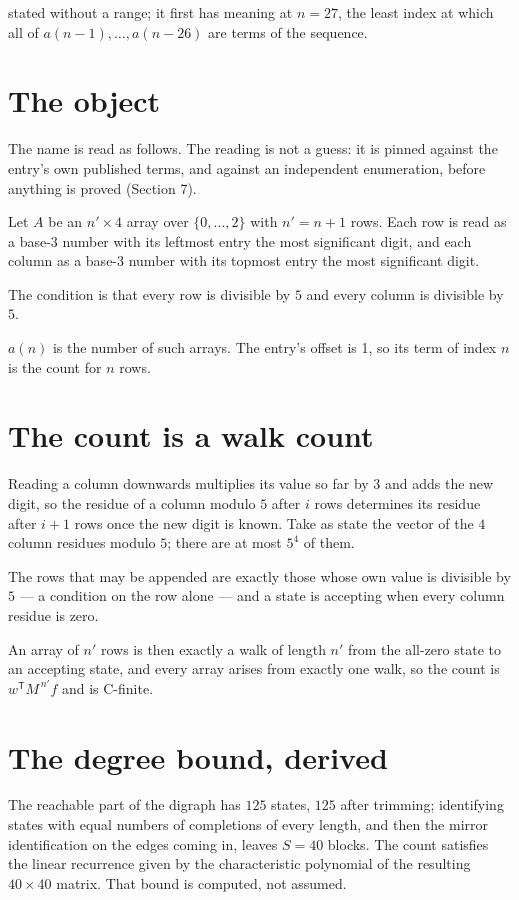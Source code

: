 \documentclass[11pt]{article}
\theoremstyle{definition}
\begin{document}
stated without a range; it first has meaning at $n = 27$, the least index at which all of $a(n-1),\dots,a(n-26)$ are terms of the sequence.

\section{The object}

The name is read as follows. The reading is not a guess: it is pinned against the entry's own published terms, and against an independent enumeration, before anything is proved (Section 7).

Let $A$ be an $n' \times 4$ array over $\{0,\dots,2\}$ with $n' = n + 1$ rows. Each row is read as a base-$3$ number with its leftmost entry the most significant digit, and each column as a base-$3$ number with its topmost entry the most significant digit.

The condition is that every row is divisible by $5$ and every column is divisible by $5$.

$a(n)$ is the number of such arrays. The entry's offset is 1, so its term of index $n$ is the count for $n$ rows.

\section{The count is a walk count}

Reading a column downwards multiplies its value so far by $3$ and adds the new digit, so the residue of a column modulo $5$ after $i$ rows determines its residue after $i+1$ rows once the new digit is known. Take as state the vector of the $4$ column residues modulo $5$; there are at most $5^{4}$ of them.

The rows that may be appended are exactly those whose own value is divisible by $5$ --- a condition on the row alone --- and a state is accepting when every column residue is zero.

An array of $n'$ rows is then exactly a walk of length $n'$ from the all-zero state to an accepting state, and every array arises from exactly one walk, so the count is $w^{\mathsf T}M^{\,n'}f$ and is C-finite.

\section{The degree bound, derived}

The reachable part of the digraph has $125$ states, $125$ after trimming; identifying states with equal numbers of completions of every length, and then the mirror identification on the edges coming in, leaves $S = 40$ blocks. The count satisfies the linear recurrence given by the characteristic polynomial of the resulting $40\times40$ matrix. That bound is computed, not assumed.
\end{document}

